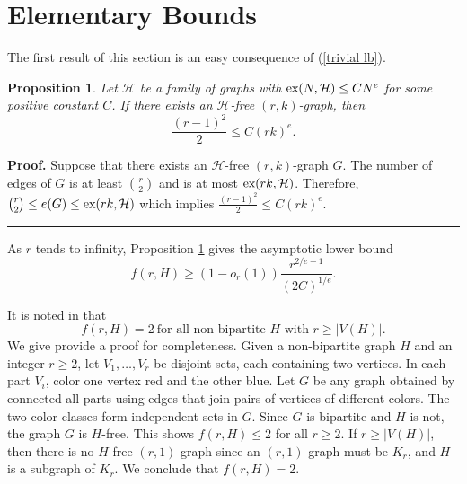 \documentclass[12pt]{article}%
\newtheorem{proposition}[theorem]{Proposition}
\newenvironment{proof}[1][Proof]{\noindent\textbf{#1.} }
{\hfill \ \rule{0.5em}{0.5em}}
\begin{document}
\section{Elementary Bounds}\label{lower bound section}



 The first result of this section is an easy consequence of (\ref{trivial lb}).

\begin{proposition}\label{lb prop}
Let $\mathcal{H}$ be a family of graphs with 
 $\textup{ex} ( N , \mathcal{H} ) \leq C N^e$ for some positive constant $C$.  
If there exists an $\mathcal{H}$-free $(r,k)$-graph, then 
\[
\frac{ (r - 1 )^2 }{2} \leq C (rk)^e.
\]
\end{proposition}
\begin{proof}	
Suppose that there exists an $\mathcal{H}$-free  
$(r,k)$-graph $G$.  The number of edges of $G$ 
is at least $\binom{r}{2}$ and is at most $\textup{ex} ( rk , \mathcal{H} )$.  Therefore, 
$\binom{r}{2} \leq e(G) \leq \textup{ex} ( rk , \mathcal{H})$ which implies $\frac{ (r-1)^{2} }{ 2 } \leq C (rk)^e$.  
\end{proof}

\bigskip

As $r$ tends to infinity, Proposition \ref{lb prop} gives the asymptotic lower bound 
\begin{equation}\label{lb on k}
f(r,H) \geq (1 - o_r(1)) \frac{r^{2/e - 1} }{ (2C)^{1/e} }.
\end{equation}   

It is noted in \cite{AxeMartin} that 
\begin{equation}\label{graph case}
    f(r ,H) = 2 ~\mbox{for all non-bipartite $H$ with 
    $r \geq |V(H)|$}.
    \end{equation}
We give provide a proof for completeness.  Given a non-bipartite graph $H$ and an integer $r \geq 2$, let $V_1, \dots , V_r$ be disjoint sets, each containing two vertices. In each part $V_i$, color one vertex red and the other blue.  Let $G$ be any graph obtained by connected all parts using edges that join pairs of vertices of different colors.  The two color classes form independent sets in $G$.  Since $G$ is bipartite and $H$ is not, the graph $G$ is $H$-free.  This shows $f(r,H) \leq 2$ for all $r \geq 2$.  If $r \geq |V(H)|$, then there is no $H$-free $(r,1)$-graph since an $(r,1)$-graph must be $K_r$, and $H$ is a subgraph of $K_r$.  We conclude that $f(r,H) = 2$.  
\end{document}

